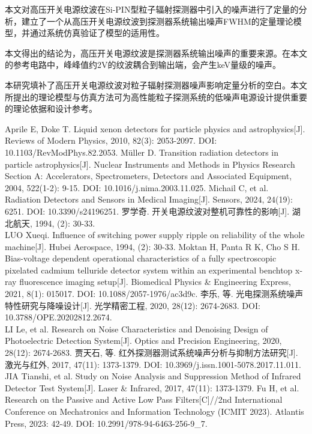 \documentclass{ctexart}
\begin{document}
本文对高压开关电源纹波在Si-PIN型粒子辐射探测器中引入的噪声进行了定量的分析，建立了一个从高压开关电源纹波到探测器系统输出噪声FWHM的定量理论模型，并通过系统仿真验证了模型的适用性。

本文得出的结论为，高压开关电源纹波是探测器系统输出噪声的重要来源。在本文的参考电路中，峰峰值约2V的纹波耦合到输出端，会产生keV量级的噪声。

本研究填补了高压开关电源纹波对粒子辐射探测器噪声影响定量分析的空白。本文所提出的理论模型与仿真方法可为高性能粒子探测系统的低噪声电源设计提供重要的理论依据和设计参考。

\begin{thebibliography}{99}
     Aprile E, Doke T. Liquid xenon detectors for particle physics and astrophysics[J]. Reviews of Modern Physics, 2010, 82(3): 2053-2097. DOI: 10.1103/RevModPhys.82.2053.
     Müller D. Transition radiation detectors in particle astrophysics[J]. Nuclear Instruments and Methods in Physics Research Section A: Accelerators, Spectrometers, Detectors and Associated Equipment, 2004, 522(1-2): 9-15. DOI: 10.1016/j.nima.2003.11.025.
     Michail C, et al. Radiation Detectors and Sensors in Medical Imaging[J]. Sensors, 2024, 24(19): 6251. DOI: 10.3390/s24196251.
     罗学奇. 开关电源纹波对整机可靠性的影响[J]. 湖北航天, 1994, (2): 30-33. \\
    LUO Xueqi. Influence of switching power supply ripple on reliability of the whole machine[J]. Hubei Aerospace, 1994, (2): 30-33.
     Moktan H, Panta R K, Cho S H. Bias-voltage dependent operational characteristics of a fully spectroscopic pixelated cadmium telluride detector system within an experimental benchtop x-ray fluorescence imaging setup[J]. Biomedical Physics \& Engineering Express, 2021, 8(1): 015017. DOI: 10.1088/2057-1976/ac3d9c.
     李乐, 等. 光电探测系统噪声特性研究与降噪设计[J]. 光学精密工程, 2020, 28(12): 2674-2683. DOI: 10.3788/OPE.20202812.2674. \\
    LI Le, et al. Research on Noise Characteristics and Denoising Design of Photoelectric Detection System[J]. Optics and Precision Engineering, 2020, 28(12): 2674-2683.
     贾天石, 等. 红外探测器测试系统噪声分析与抑制方法研究[J]. 激光与红外, 2017, 47(11): 1373-1379. DOI: 10.3969/j.issn.1001-5078.2017.11.011. \\
    JIA Tianshi, et al. Study on Noise Analysis and Suppression Method of Infrared Detector Test System[J]. Laser \& Infrared, 2017, 47(11): 1373-1379.
     Fu H, et al. Research on the Passive and Active Low Pass Filters[C]//2nd International Conference on Mechatronics and Information Technology (ICMIT 2023). Atlantis Press, 2023: 42-49. DOI: 10.2991/978-94-6463-256-9\_7.

\end{thebibliography}
\end{document}
